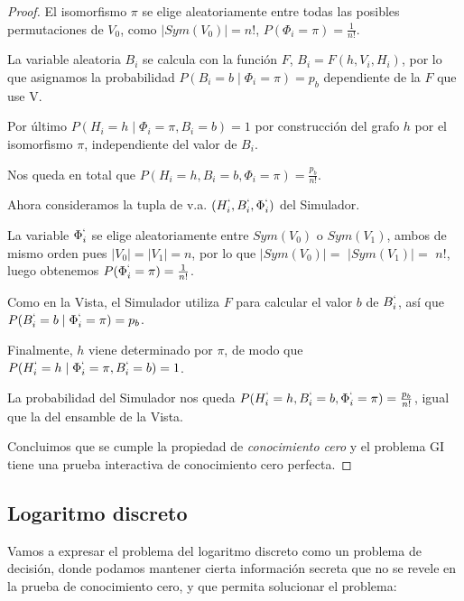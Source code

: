 \begin{proof}
	El isomorfismo $\pi$ se elige aleatoriamente entre todas las posibles permutaciones de $V_0$, como $\mid Sym(V_0) \mid = n!$, $P(\Phi_i = \pi) = \frac{1}{n!}$.
	
	La variable aleatoria $B_i$ se calcula con la función $F$, $B_i=F(h, V_i, H_i)$, por lo que asignamos la probabilidad $P(B_i = b \mid \Phi_i = \pi) = p_b$ dependiente de la $F$ que use V.

	Por último $P(H_i = h \mid \Phi_i = \pi, B_i=b) = 1$ por construcción del grafo $h$ por el isomorfismo $\pi$, independiente del valor de $B_i$.
	
	Nos queda en total que $P(H_i=h, B_i=b, \Phi_i = \pi) = \frac{p_b}{n!}$.
	
	\hfil
	
	Ahora consideramos la tupla de v.a.  $(H_i^`, B_i^`, \Phi_i^`)$ del Simulador.
	
	La variable $\Phi_i^`$ se elige aleatoriamente entre $Sym(V_0)$ o $Sym(V_1)$, ambos de mismo orden pues $\mid V_0 \mid = \mid V_1 \mid = n$, por lo que  $\mid Sym(V_0) \mid =$ $ \mid Sym(V_1) \mid =$ $ n!$, luego obtenemos $P(\Phi_i^` = \pi)=\frac{1}{n!}$.
	
	Como en la Vista, el Simulador utiliza $F$ para calcular el valor $b$ de $B_i^`$, así que $P(B_i^` = b \mid \Phi_i^` = \pi) = p_b$.
	
	Finalmente, $h$ viene determinado por $\pi$, de modo que $P(H_i^` = h \mid \Phi_i^` = \pi, B_i^`=b) = 1$.
	
	La probabilidad del Simulador nos queda $P(H_i^`=h, B_i^`=b, \Phi_i^` = \pi) = \frac{p_b}{n!}$, igual que la del ensamble de la Vista.
	
	\hfil
	
	
	Concluimos que se cumple la propiedad de \textit{conocimiento cero} y el problema GI tiene una prueba interactiva de conocimiento cero perfecta.
	
	
\end{proof}







\subsection{Logaritmo discreto}


Vamos a expresar el problema del logaritmo discreto como un problema de decisión, donde podamos mantener cierta información secreta que no se revele en la prueba de conocimiento cero, y que permita solucionar el problema:

